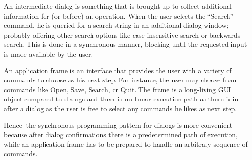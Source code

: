 \documentclass[twocolumn,a4paper]{article}
\newcommand {\concept} [1] {{\sl #1}\index{#1}}
\newcommand {\code}[1]{{\sffamily #1}}
\newcommand {\CLIM}{{\small CLIM}}
\let\method\code
\let\macro\code
\begin{document}
An intermediate dialog is something that is brought up to collect
additional information for (or before) an operation. When the user
selects the ``Search'' command, he is queried for a search string in
an additional dialog window; probably offering other search options
like case insensitive search or backwards search. This is done in a
synchronous manner, blocking until the requested input is made
available by the user.



An application frame is an interface that provides the user with a
variety of commands to choose as his next step. For instance, the user
may choose from commands like Open, Save, Search, or Quit. The frame
is a long-living GUI object compared to dialogs and there is no linear
execution path as there is in after a dialog as the user is free to
select any commands he likes as next step.

Hence, the synchronous programming pattern for dialogs is more
convenient because after dialog confirmations there is a predetermined
path of execution, while an application frame has to be prepared to
handle an arbitrary sequence of commands.

\end{document}
